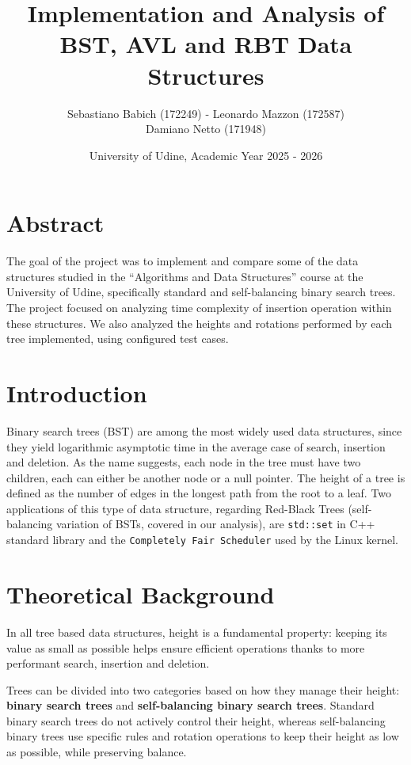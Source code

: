 \documentclass[12pt,a4paper]{article}
\title{\textbf{Implementation and Analysis of BST, AVL and RBT Data Structures}}
\author{Sebastiano Babich (172249) - Leonardo Mazzon (172587) \\Damiano Netto (171948)}
\date{University of Udine, Academic Year 2025 - 2026}
\begin{document}
    \maketitle
    \tableofcontents
    \newpage

    \section{Abstract}

        The goal of the project was to implement and compare some of the data structures studied in the “Algorithms and Data Structures” course at the University of Udine,
        specifically standard and self-balancing binary search trees. The project focused on analyzing time complexity of insertion operation within these structures. We also analyzed the heights and rotations performed by each tree implemented, using configured test cases.

    \section{Introduction}

        Binary search trees (BST) are among the most widely used data structures, since they yield logarithmic asymptotic time in the average case of search, insertion and deletion. As the name suggests, each node in the tree must have two children, each can either be another node or a null pointer. The height of a tree is defined as the number of edges in the longest path from the root to a leaf.
        Two applications of this type of data structure, regarding Red-Black Trees (self-balancing variation of BSTs, covered in our analysis), are \texttt{std::set}\cite{std_set} in C++ standard library and the \texttt{Completely Fair Scheduler}\cite{cfs_linux} used by the Linux kernel.

    \section{Theoretical Background}
    
        In all tree based data structures, height is a fundamental property: keeping its value as small as possible helps ensure efficient operations thanks to more performant search, insertion and deletion.

        Trees can be divided into two categories based on how they manage their height: \textbf{binary search trees} and \textbf{self-balancing binary search trees}. Standard binary search trees do not actively control their height, whereas self-balancing binary trees use specific rules and rotation operations to keep their height as low as possible, while preserving balance.
\end{document}
